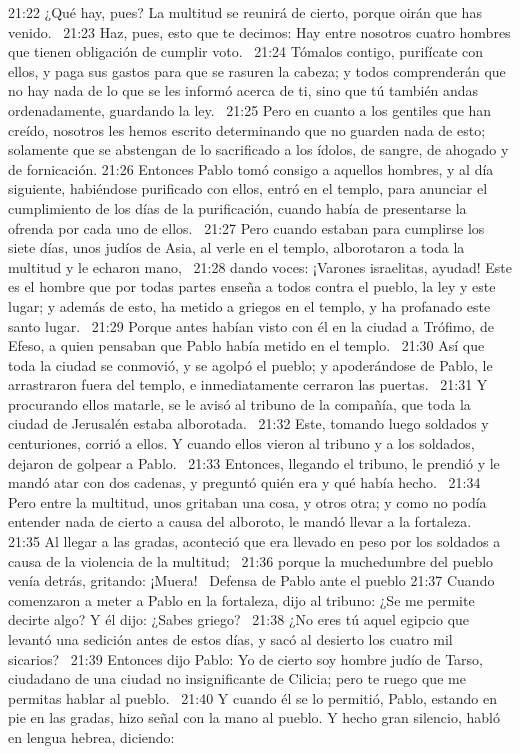 21:22 ¿Qué hay, pues? La multitud se reunirá de cierto, porque oirán que has venido.  
21:23 Haz, pues, esto que te decimos: Hay entre nosotros cuatro hombres que tienen obligación de cumplir voto.  
21:24 Tómalos contigo, purifícate con ellos, y paga sus gastos para que se rasuren la cabeza; y todos comprenderán que no hay nada de lo que se les informó acerca de ti, sino que tú también andas ordenadamente, guardando la ley.  
21:25 Pero en cuanto a los gentiles que han creído, nosotros les hemos escrito determinando que no guarden nada de esto; solamente que se abstengan de lo sacrificado a los ídolos, de sangre, de ahogado y de fornicación. 
21:26 Entonces Pablo tomó consigo a aquellos hombres, y al día siguiente, habiéndose purificado con ellos, entró en el templo, para anunciar el cumplimiento de los días de la purificación, cuando había de presentarse la ofrenda por cada uno de ellos.  
21:27 Pero cuando estaban para cumplirse los siete días, unos judíos de Asia, al verle en el templo, alborotaron a toda la multitud y le echaron mano,  
21:28 dando voces: ¡Varones israelitas, ayudad! Este es el hombre que por todas partes enseña a todos contra el pueblo, la ley y este lugar; y además de esto, ha metido a griegos en el templo, y ha profanado este santo lugar.  
21:29 Porque antes habían visto con él en la ciudad a Trófimo, de Efeso, a quien pensaban que Pablo había metido en el templo.  
21:30 Así que toda la ciudad se conmovió, y se agolpó el pueblo; y apoderándose de Pablo, le arrastraron fuera del templo, e inmediatamente cerraron las puertas.  
21:31 Y procurando ellos matarle, se le avisó al tribuno de la compañía, que toda la ciudad de Jerusalén estaba alborotada.  
21:32 Este, tomando luego soldados y centuriones, corrió a ellos. Y cuando ellos vieron al tribuno y a los soldados, dejaron de golpear a Pablo.  
21:33 Entonces, llegando el tribuno, le prendió y le mandó atar con dos cadenas, y preguntó quién era y qué había hecho.  
21:34 Pero entre la multitud, unos gritaban una cosa, y otros otra; y como no podía entender nada de cierto a causa del alboroto, le mandó llevar a la fortaleza.  
21:35 Al llegar a las gradas, aconteció que era llevado en peso por los soldados a causa de la violencia de la multitud;  
21:36 porque la muchedumbre del pueblo venía detrás, gritando: ¡Muera!  
Defensa de Pablo ante el pueblo 
21:37 Cuando comenzaron a meter a Pablo en la fortaleza, dijo al tribuno: ¿Se me permite decirte algo? Y él dijo: ¿Sabes griego?  
21:38 ¿No eres tú aquel egipcio que levantó una sedición antes de estos días, y sacó al desierto los cuatro mil sicarios?  
21:39 Entonces dijo Pablo: Yo de cierto soy hombre judío de Tarso, ciudadano de una ciudad no insignificante de Cilicia; pero te ruego que me permitas hablar al pueblo.  
21:40 Y cuando él se lo permitió, Pablo, estando en pie en las gradas, hizo señal con la mano al pueblo. Y hecho gran silencio, habló en lengua hebrea, diciendo:  
